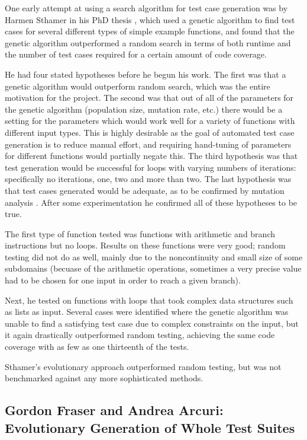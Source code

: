 \documentclass{sig-alternate-05-2015}
\begin{document}
One early attempt at using a search algorithm for test case generation was by
Harmen Sthamer in his PhD thesis \cite{sthamer}, which used a genetic algorithm
to find test
cases for several different types of simple example functions, and found that
the genetic algorithm outperformed a random search in terms of both runtime and
the number of test cases required for a certain amount of code coverage.

He had four stated hypotheses before he begun his work. The first was that a
genetic algorithm would outperform random search, which was the entire
motivation for the project. The second was that out of all of the parameters
for the genetic algorithm (population size, mutation rate, etc.) there would be
a setting for the parameters which would work well for a variety of functions
with different input types. This is highly desirable as the goal of automated
test case generation is to reduce manual effort, and requiring hand-tuning of
parameters for different functions would partially negate this. The third
hypothesis was that test generation would be successful for loops with varying
numbers of iterations: specifically no iterations, one, two and more than two.
The last hypothesis was that test cases generated would be adequate, as to be
confirmed by mutation analysis \cite{demillo1}. After some experimentation he
confirmed all of these hypotheses to be true.

The first type of function tested was functions with arithmetic and branch
instructions but no loops. Results on these functions were very good; random
testing did not do as well, mainly due to the noncontinuity and small size of
some subdomains (becuase of the arithmetic operations, sometimes a very precise
value had to be chosen for one input in order to reach a given branch).

Next, he tested on functions with loops that took complex data structures such
as lists as input. Several cases were identified where the genetic algorithm
was unable to find a satisfying test case due to complex constraints on the
input, but it again drastically outperformed random testing, achieving the same
code coverage with as few as one thirteenth of the tests.

Sthamer's evolutionary approach outperformed random testing, but was not
benchmarked against any more sophisticated methods.

\subsection{Gordon Fraser and Andrea Arcuri: \\Evolutionary Generation of Whole
            Test Suites}
\label{wts}
\end{document}
